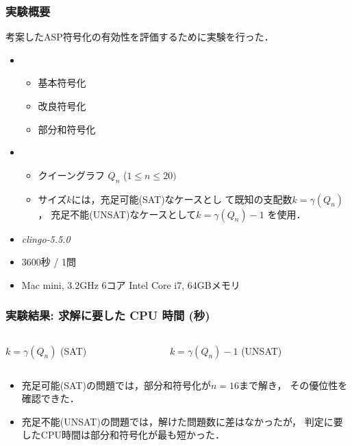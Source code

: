 \documentclass[dvipdfmx,10pt]{beamer}
\begin{document}
%
%
\begin{frame}\frametitle{実験概要}
  \begin{block}{}\centering
    考案したASP符号化の有効性を評価するために実験を行った．    
  \end{block}
  \vfill
  \begin{itemize}
  \item {}
    \begin{itemize}
    \item 基本符号化
    \item 改良符号化
    \item 部分和符号化
    \end{itemize}
  \item {}
    \begin{itemize}
    \item クイーングラフ $Q_{n}$ \quad ($1 \leq n \leq 20)$
    \item サイズ$k$には，充足可能(\textsf{SAT})なケースとし
      て既知の支配数$k=\gamma(Q_{n})$，
      充足不能(\textsf{UNSAT})なケースとして$k=\gamma(Q_{n})-1$ を使用．
    \end{itemize}
  \item {} \textit{clingo-5.5.0}
  \item {} 3600秒 / 1問
  \item {} Mac mini, 3.2GHz 6コア Intel Core i7, 64GBメモリ
  \end{itemize}
\end{frame}


%
%

\begin{frame}\frametitle{実験結果: 求解に要した CPU 時間 (秒)}

 \begin{columns}
  \begin{column}{0.50\textwidth}
   \begin{table}[htbp]
     \caption{$k=\gamma(Q_{n})$ (\textsf{SAT})}
     \scalebox{0.7}{
    }
   \end{table}
  \end{column}
  \begin{column}{0.50\textwidth}
   \begin{table}[htbp]
     \caption{$k=\gamma(Q_{n})-1$ (\textsf{UNSAT})}
    \scalebox{0.7}{
    }
   \end{table}
  \end{column}
 \end{columns} 
 \begin{itemize}
 \item 充足可能(\textsf{SAT})の問題では，部分和符号化が$n=16$まで解き，
   その優位性を確認できた．
 \item 充足不能(\textsf{UNSAT})の問題では，解けた問題数に差はなかったが，
   判定に要したCPU時間は部分和符号化が最も短かった．
 \end{itemize}
\end{frame}
\end{document}
